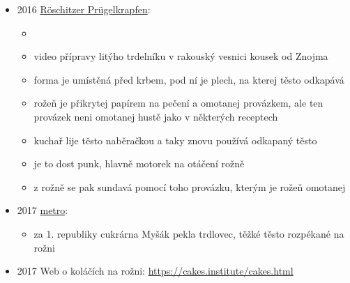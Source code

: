\begin{itemize}
  \begin{itemize}
  \tightlist
  \item
    prügelkrapfen, litý trdelník, 
  \item
    pečivo na křtiny a svatby, dodnes se dělá v okolí
     a ve Štýrsku
  \item
    původně pochází z klášterních kuchyní, před otevřeným ohněm byly
    velké dřevěné špízy otáčeny, těsto bylo aplikováno ve vrstvách.
  \item
    Těsto připomíná sušenku. Nicméně, liší se od oblasti k oblasti,
    přesná konzistence je tajemstvím, které někdy obsahuje nejen
    normální pšeničnou mouku, ale také bramborovou mouku.
  \end{itemize}
\item
  2016 \href{https://www.youtube.com/watch?v=uSByxUmCz1E}{Röschitzer
  Prügelkrapfen}:

  \begin{itemize}
  \tightlist
  \item
     
  \item
    video přípravy litýho trdelníku  v rakouský
    vesnici kousek od Znojma
  \item
    forma je umístěná před krbem, pod ní je plech, na kterej těsto
    odkapává
  \item
    rožeň je přikrytej papírem na pečení a omotanej provázkem, ale ten
    provázek neni omotanej hustě jako v některých receptech
  \item
    kuchař lije těsto naběračkou a taky znovu používá odkapaný těsto
  \item
    je to dost punk, hlavně motorek na otáčení rožně
  \item
    z rožně se pak sundavá pomocí toho provázku, kterým je rožeň
    omotanej
  \end{itemize}
\item
  2017
  \href{https://www.metro.cz/praha/masarykovi-pekli-dort-cukrarnu-zavrelo-znarodneni.A171019_160631_metro-praha_lam}{metro}:

  \begin{itemize}
  \tightlist
  \item
    za 1. republiky cukrárna Myšák pekla trdlovec, těžké těsto rozpékané
    na rožni
  \end{itemize}
\item
  2017 Web o koláčích na rožni: \url{https://cakes.institute/cakes.html}


\end{itemize}
